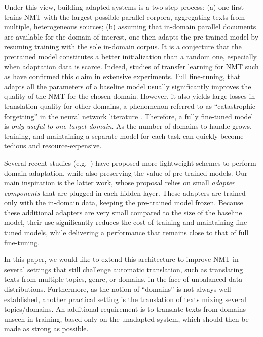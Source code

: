 \documentclass[11pt,a4paper]{article}
\newcommand{\fyDone}[1]{\done[FY]\Todo[FY:]{\textcolor{orange}{#1}}}
\begin{document}
Under this view, building adapted systems is a two-step process: (a) one first trains NMT with the largest possible parallel corpora, aggregating texts from multiple, heterogeneous sources; (b) assuming that in-domain parallel documents are available for the domain of interest, one then adapts the pre-trained model by resuming training with the sole in-domain corpus. It is a conjecture that the pretrained model constitutes a better initialization than a random one, especially when adaptation data is scarce. Indeed, studies of transfer learning for NMT such as \citep{artetxe20cross,aji20neural} have confirmed this claim in extensive experiments. Full fine-tuning, that adapts all the parameters of a baseline model usually significantly improves the quality of the NMT for the chosen domain. However, it also yields large losses in translation quality for other domains, a phenomenon referred to as ``catastrophic forgetting'' in the neural network literature \cite{McCloskey89catastrophic}. Therefore, a fully fine-tuned model is \emph{only useful to one target domain}. As the number of domains to handle grows, training, and maintaining a separate model for each task can quickly become tedious and resource-expensive.\fyDone{Fix this sentence.}

Several recent studies (e.g.\ \citep{Vilar18learning,Wuebker18compact,Michel18extreme,Bapna19simple}) have proposed more lightweight schemes to perform domain adaptation, while also preserving  the value of pre-trained models. Our main inspiration is the latter work, whose proposal relies on small \emph{adapter components} that are plugged in each hidden layer. These adapters are trained only with the in-domain data, keeping the pre-trained model frozen. Because these additional adapters are very small compared to the size of the baseline model, their use significantly reduces the cost of training and maintaining fine-tuned models, while delivering a performance that remains close to that of full fine-tuning.

In this paper, we would like to extend this architecture to improve NMT in several settings that still challenge automatic translation, such as translating texts from multiple topics, genre, or domains, in the face of unbalanced data distributions. Furthermore, as the notion of ``domains''  is not always well established, another practical setting is the translation of texts mixing several topics/domains. An additional requirement is to translate texts from domains unseen in training, based only on the unadapted system, which should then be made as strong as possible. 
\fyDone{Say differently: various implementations}
\end{document}
